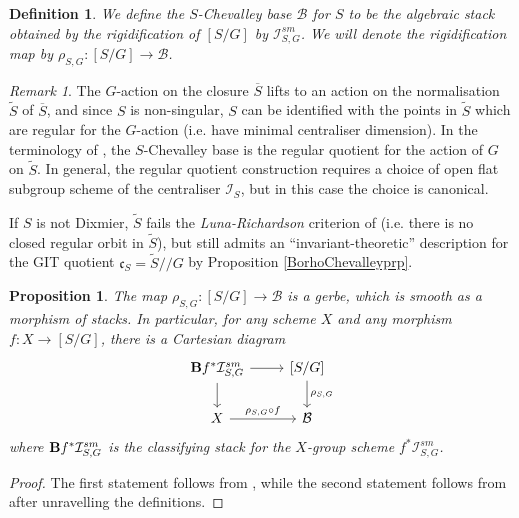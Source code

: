\documentclass{amsart}
\newtheorem{proposition}[theorem]{Proposition}
\newtheorem{definition}[theorem]{Definition}
\theoremstyle{remark}
\newtheorem{remark}[theorem]{Remark}
\numberwithin{theorem}{section}
\numberwithin{equation}{section}
\begin{document}
\begin{definition}\label{StackyChevalleyBasedef}
We define the \emph{$S$-Chevalley base} $\mathcal B$ for $S$ to be the algebraic stack obtained by the rigidification of $[S/G]$ by $\mathcal I_{S,G}^{sm}$. We will denote the rigidification map by $\rho_{S,G}:[S/G] \rightarrow \mathcal B$.
\end{definition}

\begin{remark}\label{RegularQuotientrmk}
    The $G$-action on the closure $\overline{S}$ lifts to an action on the normalisation $\tilde{S}$ of $\overline{S}$, and since $S$ is non-singular, $S$ can be identified with the points in $\tilde{S}$ which are regular for the $G$-action (i.e. have minimal centraliser dimension). In the terminology of \cite[Section 4.2]{Ngo3}, the $S$-Chevalley base is the regular quotient for the action of $G$ on $\tilde{S}$. In general, the regular quotient construction requires a choice of open flat subgroup scheme of the centraliser $\mathcal I_S$, but in this case the choice is canonical.

    If $S$ is not Dixmier, $\tilde{S}$ fails the \emph{Luna-Richardson} criterion of \cite[Section 4.1]{Ngo3} (i.e. there is no closed regular orbit in $\tilde{S}$), but still admits an ``invariant-theoretic'' description for the GIT quotient $\mathfrak{c}_S = \tilde{S}//G$ by Proposition \ref{BorhoChevalleyprp}.
\end{remark}

\begin{proposition}\label{StackyChevalleyBaseprp}
The map $\rho_{S,G}:[S/G] \rightarrow \mathcal B$ is a gerbe, which is smooth as a morphism of stacks. In particular, for any scheme $X$ and any morphism $f:X \rightarrow [S/G]$, there is a Cartesian diagram
\begin{equation}\label{StackyChevalleyBaseeqn}
\begin{tikzcd}
{\bf B} f^*\mathcal I_{S,G}^{sm}  \arrow[r] \arrow[d] & {[S/G]} \arrow[d,"\rho_{S,G}"] \\
X \arrow[r, "\rho_{S,G} \circ f"]                  & \mathcal B                     
\end{tikzcd}
\end{equation}
where ${\bf B} f^*\mathcal I_{S,G}^{sm}$ is the classifying stack for the $X$-group scheme $f^*\mathcal I_{S,G}^{sm}$.
\end{proposition}

\begin{proof} 
The first statement follows from \cite[Theorem A.1]{AOV}, while the second statement follows from \cite[Remark A.2]{AOV} after unravelling the definitions.
\end{proof}
\end{document}
